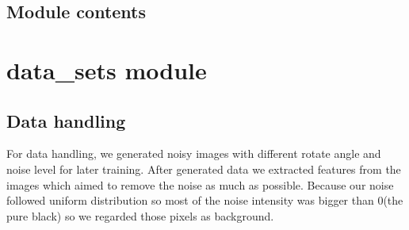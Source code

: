 \documentclass[letterpaper,10pt,english]{sphinxmanual}
\begin{document}
\begin{fulllineitems}

\begin{fulllineitems}
\label{\detokenize{strategy:strategy.base_strategy.StrategyBase.set_roll_the_dice}}
\pysigstartsignatures
{}
\pysigstopsignatures
\end{fulllineitems}


\end{fulllineitems}



\section{Module contents}
\label{\detokenize{strategy:module-strategy}}\label{\detokenize{strategy:module-contents}}
\sphinxstepscope


\chapter{data\_sets module}
\label{\detokenize{data_sets:data-sets-module}}\label{\detokenize{data_sets::doc}}

\section{Data handling}
\label{\detokenize{data_sets:data-handling}}
\sphinxAtStartPar
For data handling, we generated noisy images with different rotate angle and noise level for later training. After generated data we extracted features from the images which aimed to remove the noise as much as possible. Because our noise followed uniform distribution so most of the noise intensity was bigger than 0(the pure black) so we regarded those pixels as background.

\label{\detokenize{data_sets:module-data_sets}}
\end{document}

